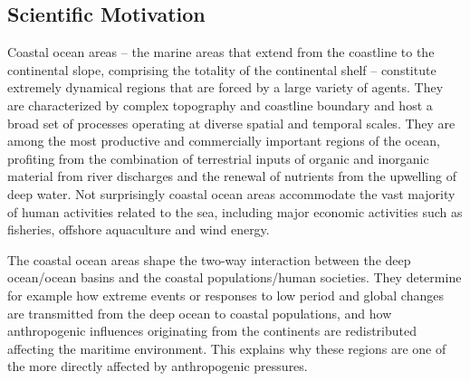 \subsection{Scientific Motivation}

Coastal ocean areas – the marine areas that extend from the coastline
to the continental slope, comprising the totality of the continental
shelf – constitute extremely dynamical regions that are forced by a
large variety of agents. They are characterized by complex topography
and coastline boundary and host a broad set of processes operating at
diverse spatial and temporal scales. They are among the most
productive and commercially important regions of the ocean, profiting
from the combination of terrestrial inputs of organic and inorganic
material from river discharges and the renewal of nutrients from the
upwelling of deep water. Not surprisingly coastal ocean areas
accommodate the vast majority of human activities related to the sea,
including major economic activities such as fisheries, offshore
aquaculture and wind energy.
 
The coastal ocean areas shape the two-way interaction between the deep
ocean/ocean basins and the coastal populations/human societies. They
determine for example how extreme events or responses to low period
and global changes are transmitted from the deep ocean to coastal
populations, and how anthropogenic influences originating from the
continents are redistributed affecting the maritime environment. This
explains why these regions are one of the more directly affected by
anthropogenic pressures.
 
